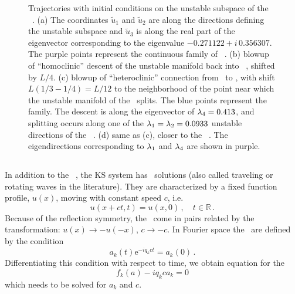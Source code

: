 {\begin{figure}[t]
\begin{center}
\end{center}
\caption{
 Trajectories with initial conditions on the unstable subspace of
 the ~\eqv.
 (a) The coordinates $\tilde{u}_1$ and $\tilde{u}_2$
 are along the directions defining the unstable subspace
 and $\tilde{u}_3$  is along the real part of the eigenvector
 corresponding to the eigenvalue $-0.271122+ i\, 0.356307$. 
The purple points represent the continuous family
 of
~\eqva.
(b) blowup of ``homoclinic'' descent of the unstable manifold
back into ~\eqv, shifted by
$L/4$.
(c) blowup of ``heteroclinic'' connection from
 \eqv\ to  \eqv, with shift
$L(1/3-1/4) = L/12$ 
to the neighborhood of the point near which the
unstable manifold of the
 \eqv\ splits. The blue points
represent the
 {\eqv} family.
The descent is along the eigenvector of $\lambda_4= 0.413$,
and splitting
occurs along one of the
$\lambda_1=\lambda_2=0.0933$
unstable directions of the ~{\eqv}.
(d) same as (c), closer to the ~{\eqv}. 
The eigendirections corresponding to $\lambda_1$
and $\lambda_4$ are shown in purple.
}
\end{figure}

\subsection{\Reqva}

In addition to the \eqva\ , the KS system has \reqv\ solutions
(also called traveling or rotating waves in the literature).
They are characterized by a fixed function profile, $u(x)$,
moving with constant speed $c$, i.e.
\[ u(x+ct,t) = u(x, 0)\,,\quad t \in \mathbb{R}\,.\]
Because of the reflection symmetry, the \reqva\ come in pairs
related by the transformation: $u(x) \to -u(-x)$, $c \to -c$.
In Fourier space the \reqva\ are defined by the condition
\[ a_k(t)\mathrm{e}^{-iq_kct} = a_k(0)\,.\]
Differentiating this condition with respect to time, we obtain
equation for the \reqv\
\[ f_k(a) - i q_k c a_k = 0 \]
which needs to be solved for $a_k$ and $c$.

}
